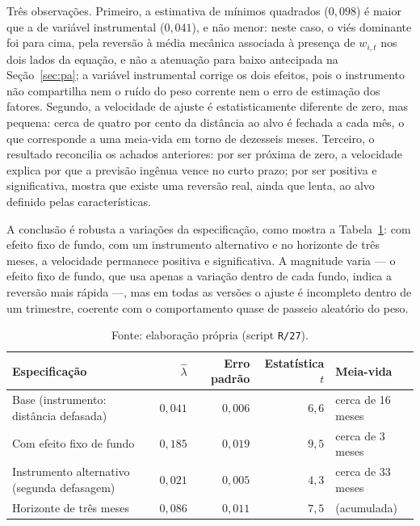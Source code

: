 \documentclass[12pt,a4paper]{article}
\begin{document}
Três observações. Primeiro, a estimativa de mínimos quadrados ($0{,}098$) é maior que a de variável
instrumental ($0{,}041$), e não menor: neste caso, o viés dominante foi para cima, pela reversão à
média mecânica associada à presença de $w_{i,t}$ nos dois lados da equação, e não a atenuação para
baixo antecipada na Seção~\ref{sec:pa}; a variável instrumental corrige os dois efeitos, pois o
instrumento não compartilha nem o ruído do peso corrente nem o erro de estimação dos fatores.
Segundo, a velocidade de ajuste é estatisticamente diferente de zero, mas pequena: cerca de quatro
por cento da distância ao alvo é fechada a cada mês, o que corresponde a uma meia-vida em torno de
dezesseis meses. Terceiro, o resultado reconcilia os achados anteriores: por ser próxima de zero, a
velocidade explica por que a previsão ingênua vence no curto prazo; por ser positiva e
significativa, mostra que existe uma reversão real, ainda que lenta, ao alvo definido pelas
características.

A conclusão é robusta a variações da especificação, como mostra a Tabela~\ref{tab:rob}: com efeito
fixo de fundo, com um instrumento alternativo e no horizonte de três meses, a velocidade permanece
positiva e significativa. A magnitude varia --- o efeito fixo de fundo, que usa apenas a variação
dentro de cada fundo, indica a reversão mais rápida ---, mas em todas as versões o ajuste é
incompleto dentro de um trimestre, coerente com o comportamento quase de passeio aleatório do peso.

\begin{table}[h]\centering\small
\caption{Robustez da velocidade de ajuste. Variável instrumental, erro-padrão agrupado por fundo.}
\label{tab:rob}
\begin{tabular}{@{}lrrrl@{}}
\toprule
Especificação & $\widehat{\lambda}$ & Erro padrão & Estatística $t$ & Meia-vida \\
\midrule
Base (instrumento: distância defasada)      & $0{,}041$ & $0{,}006$ & $6{,}6$ & cerca de 16 meses \\
Com efeito fixo de fundo                     & $0{,}185$ & $0{,}019$ & $9{,}5$ & cerca de 3 meses \\
Instrumento alternativo (segunda defasagem)  & $0{,}021$ & $0{,}005$ & $4{,}3$ & cerca de 33 meses \\
Horizonte de três meses                      & $0{,}086$ & $0{,}011$ & $7{,}5$ & (acumulada) \\
\bottomrule
\end{tabular}
\caption*{\footnotesize Fonte: elaboração própria (script \texttt{R/27}).}
\end{table}
\end{document}
